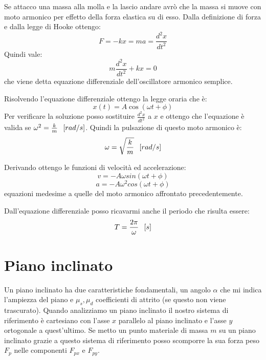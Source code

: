 \documentclass[class=book, crop=false, oneside, 12pt]{standalone}
\begin{document}
Se attacco una massa alla molla e la lascio andare avrò che la massa si muove con moto armonico per effetto della forza elastica su di esso.
Dalla definizione di forza e dalla legge di Hooke ottengo:
\begin{equation*}
    F = -kx = m a = \frac{d^2 x}{dt^2}
\end{equation*}
Quindi vale:
\begin{equation}
    m \frac{d^2 x}{dt^2} + k x = 0  
\end{equation}
che viene detta equazione differenziale dell'oscillatore armonico semplice. 

Risolvendo l'equazione differenziale ottengo la legge oraria che è:
\begin{equation}
    x(t) = A \cos (\omega t + \phi)
\end{equation}
Per verificare la soluzione posso sostituire \(\frac{d^2x}{dt^2}\) a \(x\) e ottengo che l'equazione è valida se \(\omega^2 = \frac{k}{m} \hspace{0.2cm} \left[rad/s\right]\).
Quindi la pulsazione di questo moto armonico è:
\begin{equation}
    \omega = \sqrt{\frac{k}{m}} \hspace{0.2cm} \left[rad/s\right]
\end{equation}

Derivando ottengo le funzioni di velocità ed accelerazione:
\begin{equation*}
    v = -A \omega sin (\omega t + \phi)
\end{equation*}
\begin{equation*}
    a = - A \omega^2 cos (\omega t + \phi)
\end{equation*}
equazioni medesime a quelle del moto armonico affrontato precedentemente.

Dall'equazione differenziale posso ricavarmi anche il periodo che risulta essere:
\begin{equation*}
    T = \frac{2 \pi}{\omega} \hspace{0.2cm} \left[s\right]
\end{equation*}

\section{Piano inclinato}

Un piano inclinato ha due caratteristiche fondamentali, un angolo \(\alpha\) che mi indica l'ampiezza del piano e \(\mu_s, \mu_d\) coefficienti di attrito (se questo non viene trascurato).
Quando analizziamo un piano inclinato il nostro sistema di riferimento è cartesiano con l'asse \(x\) parallelo al piano inclinato e l'asse \(y\) ortogonale a quest'ultimo.
Se metto un punto materiale di massa \(m\) su un piano inclinato grazie a questo sistema di riferimento posso scomporre la sua forza peso \(F_p\) nelle componenti \(F_{px}\) e \(F_{py}\).
\end{document}
